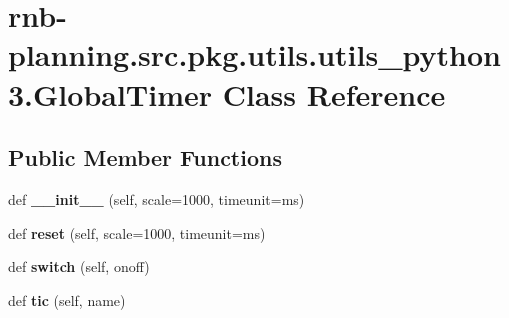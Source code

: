 \hypertarget{classrnb-planning_1_1src_1_1pkg_1_1utils_1_1utils__python3_1_1_global_timer}{}\section{rnb-\/planning.src.\+pkg.\+utils.\+utils\+\_\+python3.\+Global\+Timer Class Reference}
\label{classrnb-planning_1_1src_1_1pkg_1_1utils_1_1utils__python3_1_1_global_timer}
\subsection*{Public Member Functions}
\begin{DoxyCompactItemize}
\item 
\mbox{\label{classrnb-planning_1_1src_1_1pkg_1_1utils_1_1utils__python3_1_1_global_timer_ae157ee0cb02006d84792ea0a1151c8fe}} 
def {\bfseries \+\_\+\+\_\+init\+\_\+\+\_\+} (self, scale=1000, timeunit=\textquotesingle{}ms\textquotesingle{})
\item 
\mbox{\label{classrnb-planning_1_1src_1_1pkg_1_1utils_1_1utils__python3_1_1_global_timer_a5942d3c402fa5573421af205b72f98a4}} 
def {\bfseries reset} (self, scale=1000, timeunit=\textquotesingle{}ms\textquotesingle{})
\item 
\mbox{\label{classrnb-planning_1_1src_1_1pkg_1_1utils_1_1utils__python3_1_1_global_timer_a44269df468b4c69a8ddda4dd947557da}} 
def {\bfseries switch} (self, onoff)
\item 
\mbox{\label{classrnb-planning_1_1src_1_1pkg_1_1utils_1_1utils__python3_1_1_global_timer_a0498b7841419850bee12d9c2b5013f1d}} 
def {\bfseries tic} (self, name)
\item 
\mbox{\label{classrnb-planning_1_1src_1_1pkg_1_1utils_1_1utils__python3_1_1_global_timer_a18a4c6594a89d04d6dafb407c6f14c52}} 

\end{DoxyCompactItemize}
